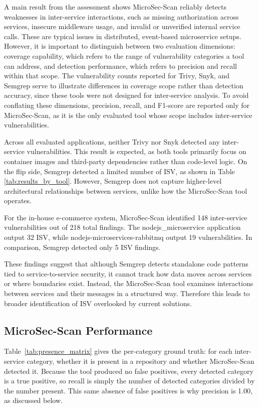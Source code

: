 \documentclass[preprint,12pt]{elsarticle}
\newcommand{\new}[1]{#1}
\begin{document}
A main result from the assessment shows MicroSec-Scan reliably detects weaknesses in inter-service interactions, such as missing authorization across services, insecure middleware usage, and invalid or unverified internal service calls. These are typical issues in distributed, event-based microservice setups. However, it is important to distinguish between two evaluation dimensions: coverage capability, which refers to the range of vulnerability categories a tool can address, and detection performance, which refers to precision and recall within that scope. The vulnerability counts reported for Trivy, Snyk, and Semgrep serve to illustrate differences in coverage scope rather than detection accuracy, since these tools were not designed for inter-service analysis. To avoid conflating these dimensions, precision, recall, and F1-score are reported only for MicroSec-Scan, as it is the only evaluated tool whose scope includes inter-service vulnerabilities.

Across all evaluated applications, neither Trivy nor Snyk detected any inter-service vulnerabilities. This result is expected, as both tools primarily focus on container images and third-party dependencies rather than code-level logic. On the flip side, Semgrep detected a limited number of ISV, as shown in Table \ref{tab:results_by_tool}. However, Semgrep does not capture higher-level architectural relationships between services, unlike how the MicroSec-Scan tool operates.

For the in-house e-commerce system, MicroSec-Scan identified 148 inter-service vulnerabilities out of 218 total findings. The nodejs\_microservice application output 32 ISV, while nodejs-microservices-rabbitmq output 19 vulnerabilities. In comparison, Semgrep detected only 5 ISV findings.

These findings suggest that although Semgrep detects standalone code patterns tied to service-to-service security, it cannot track how data moves across services or where boundaries exist. Instead, the MicroSec-Scan tool examines interactions between services and their messages in a structured way. Therefore this leads to broader identification of ISV overlooked by current solutions.


\subsection{MicroSec-Scan Performance}

\new{Table~\ref{tab:presence_matrix} gives the per-category ground truth: for each inter-service category, whether it is present in a repository and whether MicroSec-Scan detected it. Because the tool produced no false positives, every detected category is a true positive, so recall is simply the number of detected categories divided by the number present. This same absence of false positives is why precision is 1.00, as discussed below.}
\end{document}
